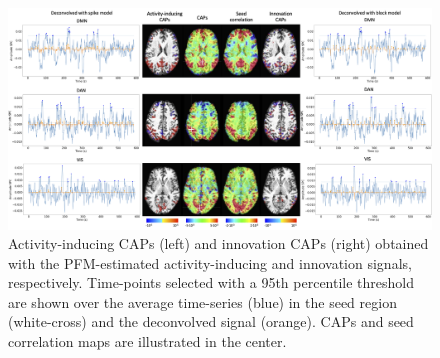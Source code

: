 \begin{figure}[H]
    \begin{center}
        \includegraphics[width=\textwidth]{figures/caps.png}
    \end{center}
    \caption{Activity-inducing CAPs (left) and innovation CAPs (right) obtained with the PFM-estimated activity-inducing and innovation signals, respectively. Time-points selected with a 95th percentile threshold are shown over the average time-series (blue) in the seed region (white-cross) and the deconvolved signal (orange). CAPs and seed correlation maps are illustrated in the center.}
\label{fig:caps}
\end{figure}

